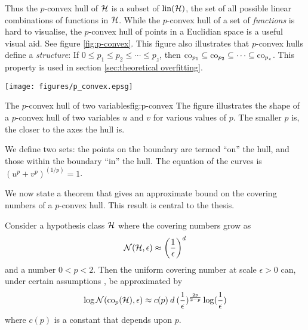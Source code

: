 Thus the $p$-convex hull of $\mathcal{H}$ is a subset of $\mathrm{lin}(\mathcal{H})$, the
set of all possible linear combinations of functions in $\mathcal{H}$.
While the $p$-convex hull of a set of \emph{functions} is hard to
visualise, the $p$-convex hull of points in a Euclidian space is a
useful visual aid.  See figure \ref{fig:p-convex}.  This figure also
illustrates that $p$-convex hulls define a \emph{structure}:  If $0
\leq p_1 \leq p_2 \leq \cdots \leq p_z$, then $\mathrm{co}_{p_1} \subseteq
\mathrm{co}_{p_2} \subseteq \cdots \subseteq \mathrm{co}_{p_z}$.  This property is
used in section 
\ref{sec:theoretical overfitting}.

\begin{linefigure}
\begin{center}
\texttt{[image: figures/p\_convex.epsg]}
\end{center}
\begin{capt}{The $p$-convex hull of two variables}{fig:p-convex}
The figure illustrates the shape of a $p$-convex hull of two variables $u$
and $v$ for various values of $p$.  The smaller $p$ is, the closer to
the axes the hull is.  

We define two sets: the points on the boundary are termed ``on'' the
hull, and those within the boundary ``in'' the hull.  The equation of
the curves is $\left( u^p + v^p \right) ^{(1/p)} = 1$.
\end{capt}
\end{linefigure}

We now state a theorem that gives an approximate bound on the covering
numbers of a $p$-convex hull.  This result is central to the thesis.

\begin{theorem}
\label{thm: p convex bound}
Consider a hypothesis class $\mathcal{H}$ where the covering numbers grow as
%
\begin{equation}
\mathcal{N}({\mathcal{H}}, {\epsilon}) \approx \left( \frac{1}{\epsilon} \right) ^d
\label{eqn:cop restriction}
\end{equation}
%
and a number $0 < p < 2$.  Then the uniform covering number at scale
$\epsilon > 0$ can, under certain assumptions \cite{Williamson99}, be
approximated by 
%
\begin{equation}
\label{eqn:approx p-convex bound}
\log \mathcal{N}({\mathrm{co}_p(\mathcal{H})}, {\epsilon}) \approx c(p) \: d \: (\frac{1}
{\epsilon})^{\frac{2p}{2-p}} \log (\frac{1}{\epsilon})
\end{equation}
%
where $c(p)$ is a constant that depends upon $p$.
\end{theorem}

